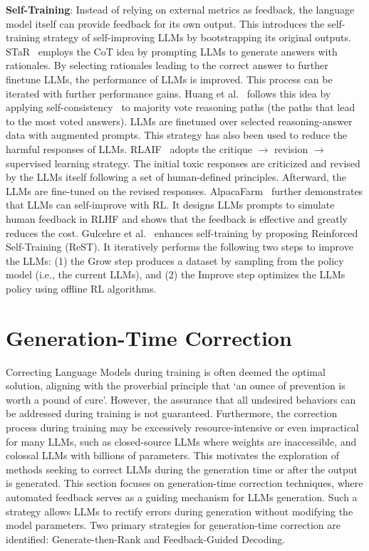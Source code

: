 \documentclass[a4paper,oneside]{book}
\begin{document}
\textbf{Self-Training}: Instead of relying on external metrics as feedback, the language model itself can provide feedback for its own output. This introduces the self-training strategy of self-improving LLMs by bootstrapping its original outputs. STaR~\cite{zelikman2022star} employs the CoT idea by prompting LLMs to generate answers with rationales. By selecting rationales leading to the correct answer to further finetune LLMs, the performance of LLMs is improved. This process can be iterated with further performance gains. Huang et al.~\cite{huang2022large} follows this idea by applying self-consistency~\cite{wang2023selfconsistency} to majority vote reasoning paths (the paths that lead to the most voted answers). LLMs are finetuned over selected reasoning-answer data with augmented prompts. This strategy has also been used to reduce the harmful responses of LLMs. RLAIF~\cite{bai2022training} adopts the critique $\rightarrow$ revision $\rightarrow$ supervised learning strategy. The initial toxic responses are criticized and revised by the LLMs itself following a set of human-defined principles. Afterward, the LLMs are fine-tuned on the revised responses. AlpacaFarm~\cite{dubois2024alpacafarm} further demonstrates that LLMs can self-improve with RL. It designs LLMs prompts to simulate human feedback in RLHF and shows that the feedback is effective and greatly reduces the cost. Gulcehre et al.~\cite{gulcehre2023reinforced} enhances self-training by proposing Reinforced Self-Training (ReST). It iteratively performs the following two steps to improve the LLMs: (1) the Grow step produces a dataset by sampling from the policy model (i.e., the current LLMs), and (2) the Improve step optimizes the LLMs policy using offline RL algorithms.

\section{Generation-Time Correction}
Correcting Language Models during training is often deemed the optimal solution, aligning with the proverbial principle that `an ounce of prevention is worth a pound of cure'. However, the assurance that all undesired behaviors can be addressed during training is not guaranteed. Furthermore, the correction process during training may be excessively resource-intensive or even impractical for many LLMs, such as closed-source LLMs where weights are inaccessible, and colossal LLMs with billions of parameters. This motivates the exploration of methods seeking to correct LLMs during the generation time or after the output is generated. This section focuses on generation-time correction techniques, where automated feedback serves as a guiding mechanism for LLMs generation. Such a strategy allows LLMs to rectify errors during generation without modifying the model parameters. Two primary strategies for generation-time correction are identified: Generate-then-Rank and Feedback-Guided Decoding.
\end{document}
